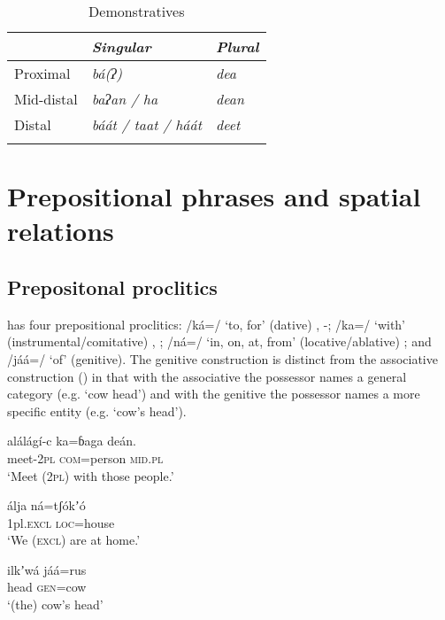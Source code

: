 \documentclass[output=paper]{langsci/langscibook}
\begin{document}
\begin{table}
\begin{tabularx}{\textwidth}{X>{\itshape}X>{\itshape}X} 
\lsptoprule & \textup{Singular} &  \textup{Plural}\\
\midrule
 Proximal &  bá(ʔ) & dea\\
 Mid-distal & baʔan \textup{/} ha &  dean\\
Distal & báát \textup{/} taat \textup{/} háát & deet\\
\lspbottomrule
\end{tabularx}
\caption{Demonstratives}
\label{tab:ahlandc:11}
\end{table}

\section{Prepositional phrases and spatial relations}\label{sec:ahlandc:10}

\subsection{Prepositonal proclitics}\label{sec:ahlandc:10.1}

 has four prepositional proclitics: /ká=/ ‘to, for’ (dative) , -; /ka=/ ‘with’ (instrumental/comitative) , ; /ná=/ ‘in, on, at, from’ (locative/ablative) ; and /jáá=/ ‘of’ (genitive).  The genitive construction  is distinct from the associative construction () in that with the associative the possessor names a general category (e.g. ‘cow head’) and with the genitive the possessor names a more specific entity (e.g. ‘cow’s head’).

\ea\label{ex:ahlandc:56}
\gll
alálágí-c  ka=ɓaga  deán.    \\
meet-\textsc{2pl}   \textsc{com}=person  \textsc{mid.pl} \\
\glt
‘Meet (\textsc{2pl}) with those people.’
\z

\ea\label{ex:ahlandc:57}
\gll
álja  ná=tʃ\'{o}kʼ\'{o} \\
1pl\textsc{.excl}   \textsc{loc}=house \\
\glt
‘We (\textsc{excl}) are at home.’
\z

\ea\label{ex:ahlandc:58}
\gll
ilkʼwá  jáá=rus \\
head   \textsc{gen}=cow \\
\glt
‘(the) cow’s head’
\z
\end{document}
